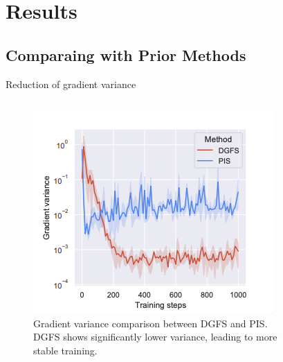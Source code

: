 \documentclass[aspectratio=169,xcolor=dvipsnames]{beamer}
\begin{document}
\section{Results}

\subsection{Comparaing with Prior Methods}

\begin{frame}[t]{Reduction of gradient variance}
\footnotesize

\vspace{-0.75cm}
\begin{columns}[t]
\begin{column}{0.33\textwidth}
\begin{figure}
    \centering
    \includegraphics[width=\textwidth]{figures/grad_variance.png}
    \caption{Gradient variance comparison between DGFS and PIS. DGFS shows significantly lower variance, leading to more stable training.}
\end{figure}
\end{column}
\begin{column}{0.33\textwidth}
\begin{figure}
    \centering

\end{figure}
\end{column}
\end{columns}
\end{frame}
\end{document}
